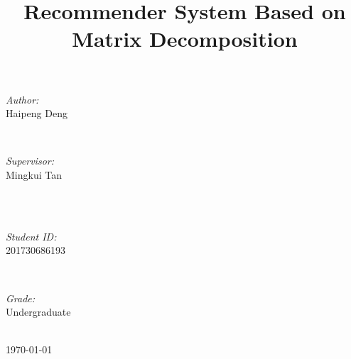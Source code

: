 \documentclass[journal, a4paper]{IEEEtran}
\begin{document}
\begin{titlepage}
\begin{minipage}{0.4\textwidth}
\begin{flushleft} \large
\emph{Author:}\\
Haipeng Deng %
\end{flushleft}
\end{minipage}
~
\begin{minipage}{0.4\textwidth}
\begin{flushright} \large
\emph{Supervisor:} \\
Mingkui Tan%
\end{flushright}
\end{minipage}\\[2cm]
~
\begin{minipage}{0.4\textwidth}
\begin{flushleft} \large
\emph{Student ID:}\\
201730686193
\end{flushleft}
\end{minipage}
~
\begin{minipage}{0.4\textwidth}
\begin{flushright} \large
\emph{Grade:} \\
Undergraduate
\end{flushright}
\end{minipage}\\[2cm]



{\large \today}\\[2cm] %



\vfill %

\end{titlepage}

	\title{Recommender System Based on Matrix Decomposition}
	\maketitle
\end{document}
